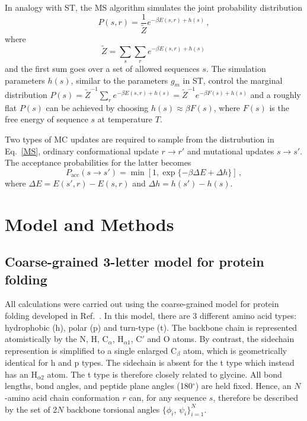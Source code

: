 \documentclass[%
 aip,
rsi,%
 amsmath,amssymb,
 reprint,%
]{revtex4-1}
\newcommand	 {\sbar}	{{s}}
\newcommand	 {\rbar}	{{r}}
\begin{document}
In analogy with ST, the MS algorithm simulates the joint probability distribution
\begin{equation}
P(\sbar,\rbar) =\dfrac{1}{\tilde{Z}}e^{-\beta E(\sbar,\rbar) + h(\sbar)}\,, 
\label{MS}
\end{equation}
where  
\begin{equation}
\tilde{Z} = \sum_{\sbar}\sum_{\rbar} e^{-\beta E(\sbar,\rbar)+ h(\sbar)}\,
\end{equation}
and the first sum goes over a set of allowed sequences $\sbar$. The simulation parameters $h(\sbar)$, similar to the parameters $g_m$ in ST, control the marginal distribution $P(\sbar)=\tilde{Z}^{-1}\sum_{\rbar} e^{-\beta E(\sbar,\rbar)+ h(\sbar)} = \tilde{Z}^{-1}e^{-\beta F(\sbar)+ h(\sbar)}$ and a roughly flat $P(\sbar)$ can be achieved by choosing $h(\sbar) \approx \beta F(\sbar)$, where $F(\sbar)$ is the free energy of sequence $\sbar$ at temperature $T$. 

Two types of MC updates are required to sample from the distrubution in Eq.~\ref{MS}, ordinary conformational update $\rbar\rightarrow\rbar'$ and mutational updates $\sbar\rightarrow\sbar'$. The acceptance probabilities for the latter  becomes
\begin{equation}
P_\mathrm{acc} (\sbar\rightarrow\sbar') = \min [1, \exp\{-\beta\Delta E+\Delta h\}]\,,
\label{accrej}
\end{equation}
where $\Delta E = E(\sbar',\rbar)-E(\sbar,\rbar)$ and $\Delta h = h({\sbar'})-h(\sbar)$.

\section{Model and Methods}
\subsection{Coarse-grained 3-letter model for protein folding}
\noindent
All calculations were carried out using the coarse-grained model for protein folding developed in Ref.~. In this model, there are 3 different amino acid types: hydrophobic (h), polar (p) and turn-type (t). The backbone chain is represented atomistically by the N, H, $\mathrm{C}_\alpha$, $\mathrm{H}_{\alpha 1}$, C$'$ and O atoms. By contrast, the sidechain represention is simplified to a single enlarged $\mathrm{C}_\beta$ atom, which is geometrically identical for h and p types. The sidechain is absent for the t type which instead has an $\mathrm{H}_{\alpha 2}$ atom. The t type is therefore closely related to glycine. All bond lengths, bond angles, and peptide plane angles (180$^\circ$) are held fixed. Hence, an $N$-amino acid chain conformation $\rbar$ can, for any sequence $\sbar$, therefore be described by the set of 2$N$ backbone torsional angles $\{\phi_i$, $\psi_i\}_{i=1}^{N}$. 
 
\end{document}
